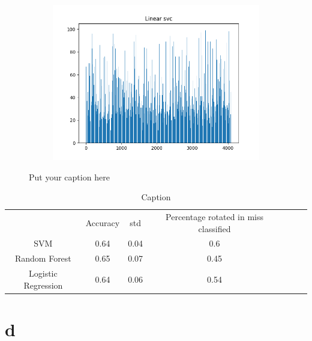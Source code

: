 \documentclass{article}
\begin{document}
\begin{figure}[H]
\begin{subfigure}{.33\textwidth}
  \label{fig:sub-second}
\end{subfigure}
\begin{subfigure}{.33\textwidth}
  \centering
  \includegraphics[width=1\linewidth]{2c/Selection SVM.png}  
  
  \label{fig:sub-second}
\end{subfigure}
\caption{Put your caption here}
\label{feet select}
\end{figure}

\begin{table}[H]
    \centering
    \begin{tabular}{c|c|c|c|c|c|c}
         & Accuracy & std & Percentage rotated in miss classified  \\
        SVM & 0.64 & 0.04 & 0.6\\
        Random Forest & 0.65 & 0.07& 0.45\\
        Logistic Regression & 0.64 & 0.06 & 0.54
    \end{tabular}
    \caption{Caption}
    \label{Rot accuracy}
\end{table}
\newpage
\section{d}
\end{document}
